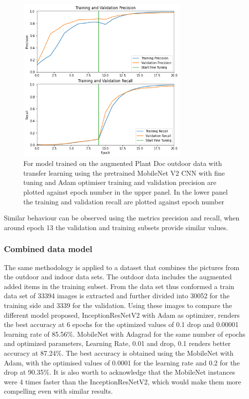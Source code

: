\documentclass[conference]{IEEEtran}
\begin{document}
\begin{figure}[htbp]
\centerline{\includegraphics[width=8.5cm]{ModelOutdoorsMobileNetOtherMetricschart.png}}
\caption{For model trained on the augmented Plant Doc outdoor data with transfer learning using the pretrained MobileNet V2 CNN with fine tuning and Adam optimiser training and validation precision are plotted against epoch number in the upper panel. In the lower panel the training and validation recall are plotted against epoch number}
\label{fig}
\end{figure}

Similar behaviour can be observed using the metrics precision and recall, when around epoch 13 the validation and training subsets provide similar values. 

\subsubsection{Combined data model}

The same methodology is applied to a dataset that combines the pictures from the outdoor and indoor data sets. The outdoor data includes the augmented added items in the training subset. From the data set thus conformed a train data set of 33394 images is extracted and further divided into 30052 for the training side and 3339 for the validation. Using these images to compare the different model proposed, InceptionResNetV2 with Adam as optimizer, renders the best accuracy at 6 epochs for the optimized values of 0.1 drop and 0.00001 learning rate of 85.56\%. MobileNet with Adagrad  for the same number of epochs and optimized parameters, Learning Rate, 0.01 and drop, 0.1 renders better accuracy at 87.24\%. The best accuracy is obtained using the MobileNet with Adam, with the optimised values of 0.0001 for the learning rate and 0.2 for the drop at 90.35\%. It is also worth to acknowledge that the MobileNet instances were 4 times faster than the InceptionResNetV2, which would make them more compelling even with similar results. \
\end{document}
